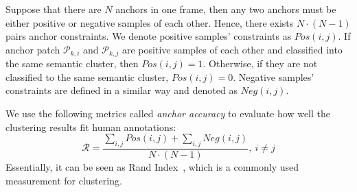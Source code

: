\documentclass[letterpaper, 10 pt, conference]{ieeeconf}  %
\begin{document}
	Suppose that there are $N$ anchors in one frame, then any two anchors must be either positive or negative samples of each other. Hence, there exists $N \cdot(N-1)$ pairs anchor constraints.
	We denote positive samples' constraints as $Pos(i,j)$. If anchor patch $\mathcal{P}_{k,i}$ and $\mathcal{P}_{k,j}$ are positive samples of each other and classified into the same semantic cluster, then $Pos(i,j)=1$. Otherwise, if they are not classified to the same semantic cluster, $Pos(i,j)=0$.
	Negative samples' constraints are defined in a similar way and denoted as $Neg(i,j)$.
	
	We use the following metrics called \textit{anchor accuracy} to evaluate how well the clustering results fit human annotations:
	\begin{equation}
	\label{R}
	\mathcal{R}=\dfrac{\sum_{i,j}{Pos(i,j)}+\sum_{i,j}{Neg(i,j)}}{N\cdot (N-1)}, ~i \neq j
	\end{equation}
	Essentially, it can be seen as Rand Index~\cite{rand1971objective}, which is a commonly used measurement for clustering.
	
\end{document}

